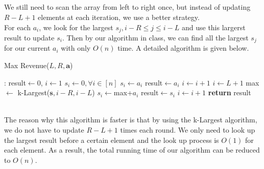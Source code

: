 \documentclass[12pt,letterpaper]{article}
\begin{document}
\subsection{}
We still need to scan the array from left to right once,
but instead of updating $R-L+1$ elements at each iteration,
we use a better strategy.\\
For each $a_i$,
we look for the largest $s_j,i-R\leq j\leq i-L$
and use this largerst result to update $s_i$.
Then by our algorithm in class,
we can find all the largest $s_j$ for our current $a_i$ with only $O(n)$ time.
A detailed algorithm is given below.
\begin{algorithm}
  \caption{Max Revenue($L,R,\boldsymbol{a}$)}\label{alg:mrlrn}
  \begin{algorithmic}[1]
  :
  \State result$\gets0$, $i\gets1$ $s_i\gets 0,\forall i\in[n]$ 
  \State $s_i\gets a_i$
  \EndIf
  \State result$\gets a_i$
  \EndIf
  \State $i\gets i+1$
  \EndWhile
  \State $i\gets L+1$
  \State max$\gets$ k-Largest($\boldsymbol{s},i-R,i-L$)
  \State $s_i\gets$max+$a_i$
  \EndIf
  \State result$\gets s_i$
  \EndIf
  \State $i\gets i+1$
  \EndWhile
  \State \textbf{return} result
  \EndProcedure
  \end{algorithmic}
\end{algorithm}\\
The reason why this algorithm is faster is that
by using the k-Largest algorithm, 
we do not have to update $R-L+1$ times each round.
We only need to look up the largest result before a certain element 
and the look up process is $O(1)$ for each element.
As a result, the total running time of our algorithm can be reduced to $O(n)$.

\newpage
\end{document}
